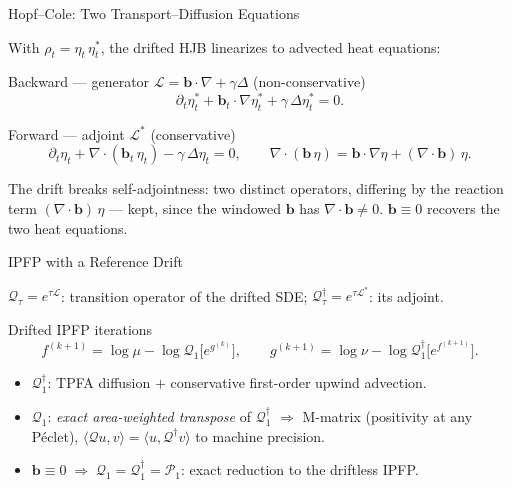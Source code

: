 \documentclass[aspectratio=169]{beamer}
\newcommand{\bt}{\mathbf{b}}
\begin{document}
\begin{frame}{Hopf–Cole: Two Transport–Diffusion Equations}

With $\rho_t = \eta_t\,\eta^*_t$, the drifted HJB linearizes to advected heat equations:

\begin{block}{Backward — generator $\mathcal{L} = \bt\cdot\nabla + \gamma\Delta$ (non-conservative)}
\[
    \partial_t \eta^*_t + \bt_t\cdot\nabla\eta^*_t + \gamma\,\Delta\eta^*_t = 0.
\]
\end{block}

\begin{block}{Forward — adjoint $\mathcal{L}^*$ (conservative)}
\[
    \partial_t \eta_t + \nabla\!\cdot(\bt_t\,\eta_t) - \gamma\,\Delta\eta_t = 0,
    \qquad
    \nabla\!\cdot(\bt\,\eta) = \bt\cdot\nabla\eta + (\nabla\!\cdot\bt)\,\eta.
\]
\end{block}

\medskip
The drift breaks self-adjointness: two distinct operators, differing by the
reaction term $(\nabla\!\cdot\bt)\,\eta$ — kept, since the windowed $\bt$ has
$\nabla\!\cdot\bt \neq 0$.  $\bt\equiv0$ recovers the two heat equations.

\end{frame}

\begin{frame}{IPFP with a Reference Drift}

$\mathcal{Q}_\tau = e^{\tau\mathcal{L}}$: transition operator of the drifted SDE;
\quad $\mathcal{Q}^{\dagger}_\tau = e^{\tau\mathcal{L}^*}$: its adjoint.

\begin{block}{Drifted IPFP iterations}
\[
    f^{(k+1)} = \log\mu - \log\mathcal{Q}_1\!\bigl[e^{g^{(k)}}\bigr],
    \qquad
    g^{(k+1)} = \log\nu - \log\mathcal{Q}^{\dagger}_1\!\bigl[e^{f^{(k+1)}}\bigr].
\]
\end{block}

\begin{itemize}
    \item $\mathcal{Q}^{\dagger}_1$: TPFA diffusion $+$ conservative first-order upwind advection.
    \item $\mathcal{Q}_1$: \emph{exact area-weighted transpose} of $\mathcal{Q}^{\dagger}_1$
          $\Rightarrow$ M-matrix (positivity at any Péclet),
          $\langle\mathcal{Q}u,v\rangle = \langle u,\mathcal{Q}^{\dagger}v\rangle$ to machine precision.
    \item $\bt\equiv0 \;\Rightarrow\; \mathcal{Q}_1=\mathcal{Q}_1^{\dagger}=\mathcal{P}_1$:
          exact reduction to the driftless IPFP.
\end{itemize}

\end{frame}
\end{document}
